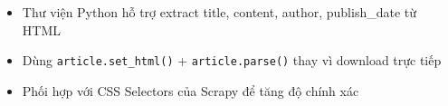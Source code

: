 \begin{itemize}
  \begin{itemize}
  \tightlist
  \item
    Thư viện Python hỗ trợ extract title, content, author, publish\_date
    từ HTML
  \item
    Dùng \texttt{article.set\_html()} + \texttt{article.parse()} thay vì
    download trực tiếp
  \item
    Phối hợp với CSS Selectors của Scrapy để tăng độ chính xác
  \end{itemize}
\end{itemize}

